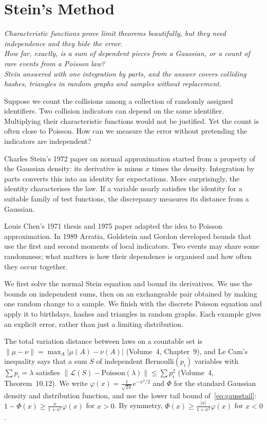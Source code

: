 \chapter{Stein's Method}
\begin{center}\itshape
Characteristic functions prove limit theorems beautifully, but they need independence and they hide the error.\\
How far, exactly, is a sum of dependent pieces from a Gaussian, or a count of rare events from a Poisson law?\\
Stein answered with one integration by parts, and the answer covers colliding hashes, triangles in random graphs and samples without replacement.
\end{center}

Suppose we count the collisions among a collection of randomly assigned identifiers. Two collision indicators can depend on the same identifier. Multiplying their characteristic functions would not be justified. Yet the count is often close to Poisson. How can we measure the error without pretending the indicators are independent?

Charles Stein's 1972 paper on normal approximation started from a property of the Gaussian density: its derivative is minus $x$ times the density. Integration by parts converts this into an identity for expectations. More surprisingly, the identity characterises the law. If a variable nearly satisfies the identity for a suitable family of test functions, the discrepancy measures its distance from a Gaussian.

Louis Chen's 1971 thesis and 1975 paper adapted the idea to Poisson approximation. In 1989 Arratia, Goldstein and Gordon developed bounds that use the first and second moments of local indicators. Two events may share some randomness; what matters is how their dependence is organised and how often they occur together.

We first solve the normal Stein equation and bound its derivatives. We use the bounds on independent sums, then on an exchangeable pair obtained by making one random change to a sample. We finish with the discrete Poisson equation and apply it to birthdays, hashes and triangles in random graphs. Each example gives an explicit error, rather than just a limiting distribution.

\begin{reminder}
The total variation distance between laws on a countable set is $\|\mu-\nu\|=\max_A|\mu(A)-\nu(A)|$ (Volume~4, Chapter~9), and Le Cam's inequality says that a
sum $S$ of independent Bernoulli$(p_i)$ variables with $\sum p_i=\lambda$ satisfies $\|\mathcal L(S)-\text{Poisson}(\lambda)\|\le\sum p_i^2$ (Volume~4, Theorem~10.12).
We write $\varphi(x)=\frac1{\sqrt{2\pi}}e^{-x^2/2}$ and $\Phi$ for the standard Gaussian density and distribution function, and use the lower tail bound
of~\eqref{eq:gausstail}: $1-\Phi(x)\ge\frac x{1+x^2}\varphi(x)$ for $x>0$. By symmetry, $\Phi(x)\ge\frac{|x|}{1+x^2}\varphi(x)$ for $x<0$.
\end{reminder}

